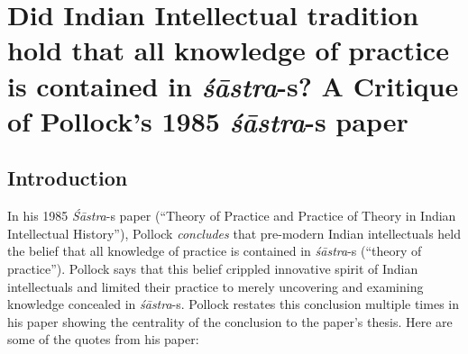 \chapter{Did Indian Intellectual tradition hold that all knowledge of practice is contained in \textit{śāstra}-s?
A Critique of Pollock's 1985 \textit{śāstra}-s paper}\label{chapter10}
\vskip -10pt

\vskip -10pt

\section*{Introduction}

In his 1985 \textit{Śāstra}-s paper (``Theory of Practice and Practice of Theory in Indian Intellectual History''), Pollock \textit{concludes} that pre-modern Indian intellectuals held the belief that all knowledge of practice is contained in \textit{śāstra}-s (``theory of practice'').  Pollock says that this belief crippled innovative spirit of Indian intellectuals and limited their practice to merely uncovering and examining knowledge concealed in \textit{śāstra}-s. Pollock restates this conclusion multiple times in his paper showing the centrality of the conclusion to the paper's thesis. Here are some of the quotes from his paper:
